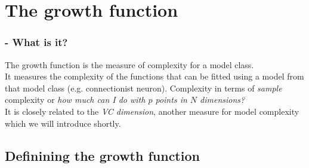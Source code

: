 \section{The growth function}


\begin{frame}\frametitle{\secname - What is it?}

The growth function is the measure of complexity for a model class.\\

It measures the complexity of the functions that can be fitted using a model from that model class (e.g. connectionist neuron).
Complexity in terms of \emph{sample} complexity or \emph{how much can I do with $p$ points in $N$ dimensions?}\\

It is closely related to the \emph{VC dimension}, another measure for model complexity which we will introduce shortly.

\end{frame}

\subsection{Definining the growth function}

